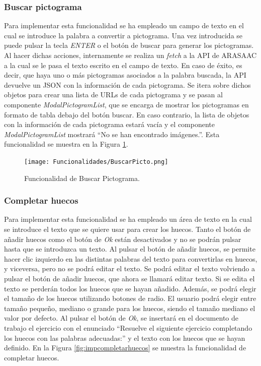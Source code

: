 \subsubsection{Buscar pictograma}
\label{sec:impbuscarpicto}
Para implementar esta funcionalidad se ha empleado un campo de texto en el cual se introduce la palabra a convertir a pictograma. Una vez introducida se puede pulsar la tecla \textit{ENTER} o el botón de buscar para generar los pictogramas. Al hacer dichas acciones, internamente se realiza un \textit{fetch} a la API de ARASAAC a la cual se le pasa el texto escrito en el campo de texto. En caso de éxito, es decir, que haya uno o más pictogramas asociados a la palabra buscada, la API devuelve un JSON con la información de cada pictograma. Se itera sobre dichos objetos para crear una lista de URLs de cada pictograma y se pasan al componente \textit{ModalPictogramList}, que se encarga de mostrar los pictogramas en formato de tabla debajo del botón buscar. En caso contrario, la lista de objetos con la información de cada pictograma estará vacía y el componente \textit{ModalPictogramList} mostrará ``No se han encontrado imágenes.''. Esta funcionalidad se muestra en la Figura \ref{fig:buscarPictograma}.

\begin{figure}[ht!]
  \centering
  \texttt{[image: Funcionalidades/BuscarPicto.png]}
  \caption{Funcionalidad de Buscar Pictograma.}
  \label{fig:buscarPictograma}
\end{figure}

\subsubsection{Completar huecos}
\label{sec:impcompletarhuecos}
Para implementar esta funcionalidad se ha empleado un área de texto en la cual se introduce el texto que se quiere usar para crear los huecos. Tanto el botón de añadir huecos como el botón de \textit{Ok} están desactivados y no se podrán pulsar hasta que se introduzca un texto. Al pulsar el botón de añadir huecos, se permite hacer clic izquierdo en las distintas palabras del texto para convertirlas en huecos, y viceversa, pero no se podrá editar el texto. Se podrá editar el texto volviendo a pulsar el botón de añadir huecos, que ahora se llamará editar texto. Si se edita el texto se perderán todos los huecos que se hayan añadido. Además, se podrá elegir el tamaño de los huecos utilizando botones de radio. El usuario podrá elegir entre tamaño pequeño, mediano o grande para los huecos, siendo el tamaño mediano el valor por defecto. Al pulsar el botón de \textit{Ok}, se insertará en el documento de trabajo el ejercicio con el enunciado ``Resuelve el siguiente ejercicio completando los huecos con las palabras adecuadas:'' y el texto con los huecos que se hayan definido. En la Figura \ref{fig:impcompletarhuecos} se muestra la funcionalidad de completar huecos.

